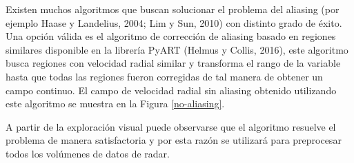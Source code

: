 \documentclass[12pt,spanish,oneside]{book}
\begin{document}
Existen muchos algoritmos que buscan solucionar el problema del aliasing
(por ejemplo Haase y Landelius, 2004; Lim y Sun, 2010) con distinto
grado de éxito. Una opción válida es el algoritmo de corrección de
aliasing basado en regiones similares disponible en la librería PyART
(Helmus y Collis, 2016), este algoritmo busca regiones con velocidad
radial similar y transforma el rango de la variable hasta que todas las
regiones fueron corregidas de tal manera de obtener un campo continuo.
El campo de velocidad radial sin aliasing obtenido utilizando este
algoritmo se muestra en la Figura \ref{no-aliasing}.

A partir de la exploración visual puede observarse que el algoritmo
resuelve el problema de manera satisfactoria y por esta razón se
utilizará para preprocesar todos los volúmenes de datos de radar.
\end{document}
